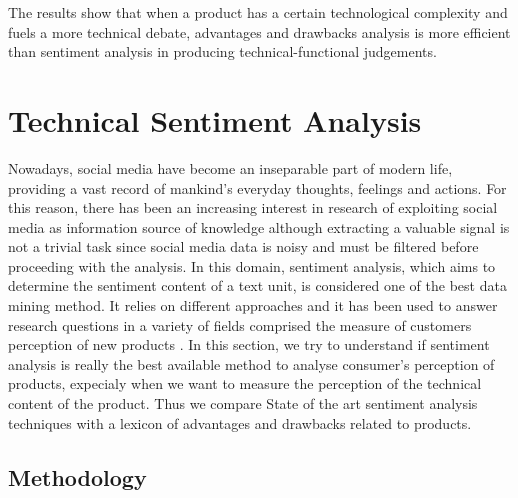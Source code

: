 \documentclass[]{book}
\begin{document}
The results show that when a product has a certain technological
complexity and fuels a more technical debate, advantages and drawbacks
analysis is more efficient than sentiment analysis in producing
technical-functional judgements.

\section{Technical Sentiment
Analysis}\label{technical-sentiment-analysis}

Nowadays, social media have become an inseparable part of modern life,
providing a vast record of mankind's everyday thoughts, feelings and
actions. For this reason, there has been an increasing interest in
research of exploiting social media as information source of knowledge
although extracting a valuable signal is not a trivial task since social
media data is noisy and must be filtered before proceeding with the
analysis. In this domain, sentiment analysis, which aims to determine
the sentiment content of a text unit, is considered one of the best data
mining method. It relies on different approaches
\citep{collomb2014study} and it has been used to answer research
questions in a variety of fields comprised the measure of customers
perception of new products \citep{mirtalaie2018extracting}. In this
section, we try to understand if sentiment analysis is really the best
available method to analyse consumer's perception of products, expecialy
when we want to measure the perception of the technical content of the
product. Thus we compare State of the art sentiment analysis techniques
with a lexicon of advantages and drawbacks related to products.

\subsection{Methodology}\label{methodology-8}
\end{document}
